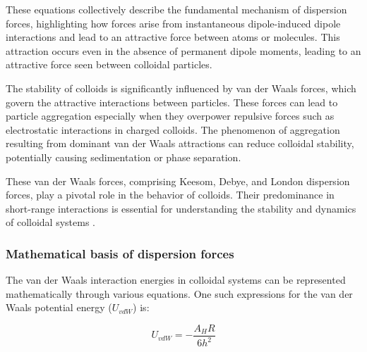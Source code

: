 These equations collectively describe the fundamental mechanism of dispersion forces, highlighting how forces arise from instantaneous dipole-induced dipole interactions and lead to an attractive force between atoms or molecules. This attraction occurs even in the absence of permanent dipole moments, leading to an attractive force seen between colloidal particles.

The stability of colloids is significantly influenced by van der Waals forces, which govern the attractive interactions between particles. These forces can lead to particle aggregation especially when they overpower repulsive forces such as electrostatic interactions in charged colloids. The phenomenon of aggregation resulting from dominant van der Waals attractions can reduce colloidal stability, potentially causing sedimentation or phase separation. 

These van der Waals forces, comprising Keesom, Debye, and London dispersion forces, play a pivotal role in the behavior of colloids. Their predominance in short-range interactions is essential for understanding the stability and dynamics of colloidal systems \cite{colloid_review1}\cite{lilBlueBook}\cite{IsGreenBook}\cite{FoundColloidBook}. %

\subsubsection{Mathematical basis of dispersion forces} %

The van der Waals interaction energies in colloidal systems can be represented mathematically through various equations. One such expressions for the van der Waals potential energy (\(U_{vdW}\)) is:

\begin{equation}  %
U_{vdW} = -\frac{A_H R}{6 h^2}
\label{Hammy}
\end{equation}


